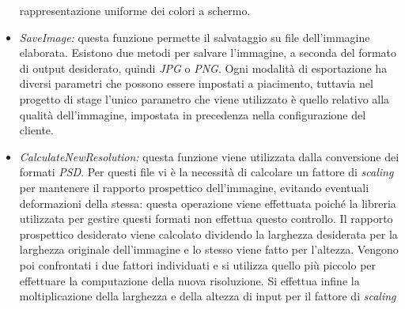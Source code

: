 \begin{itemize}
            rappresentazione uniforme dei colori a schermo.
      \item \emph{SaveImage:} questa funzione permette il salvataggio su file
            dell'immagine elaborata. Esistono due metodi per salvare l'immagine, a
            seconda del formato di output desiderato, quindi \emph{JPG} o \emph{PNG}.
            Ogni modalità di esportazione ha diversi parametri che possono essere
            impostati a piacimento, tuttavia nel progetto di stage l'unico parametro che viene
            utilizzato è quello relativo alla qualità dell'immagine, impostata in
            precedenza nella configurazione del cliente.
      \item \emph{CalculateNewResolution:} questa funzione viene utilizzata dalla
            conversione dei formati \emph{PSD}. Per questi file vi è la necessità di
            calcolare un fattore di \emph{scaling} per mantenere il rapporto prospettico
            dell'immagine, evitando eventuali deformazioni della stessa: questa operazione
            viene effettuata poiché la libreria utilizzata per gestire questi formati
            non effettua questo controllo.
            Il rapporto prospettico desiderato viene calcolato dividendo la larghezza desiderata per la larghezza originale
            dell'immagine e lo stesso viene fatto per l'altezza. Vengono poi confrontati
            i due fattori individuati e si utilizza quello più piccolo per effettuare la
            computazione della nuova risoluzione. Si effettua infine la moltiplicazione
            della larghezza e della altezza di input per il fattore di \emph{scaling}
\end{itemize}
